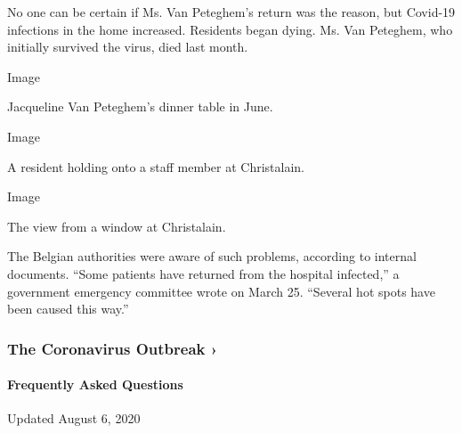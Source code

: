 No one can be certain if Ms. Van Peteghem's return was the reason, but
Covid-19 infections in the home increased. Residents began dying. Ms.
Van Peteghem, who initially survived the virus, died last month.

Image

Jacqueline Van Peteghem's dinner table in June.

Image

A resident holding onto a staff member at Christalain.

Image

The view from a window at Christalain.

The Belgian authorities were aware of such problems, according to
internal documents. ``Some patients have returned from the hospital
infected,'' a government emergency committee wrote on March 25.
``Several hot spots have been caused this way.''

\href{https://www.nytimes.com/news-event/coronavirus?action=click\&pgtype=Article\&state=default\&region=MAIN_CONTENT_3\&context=storylines_faq}{}

\hypertarget{the-coronavirus-outbreak-}{%
\subsubsection{The Coronavirus Outbreak
›}\label{the-coronavirus-outbreak-}}

\hypertarget{frequently-asked-questions}{%
\paragraph{Frequently Asked
Questions}\label{frequently-asked-questions}}

Updated August 6, 2020

